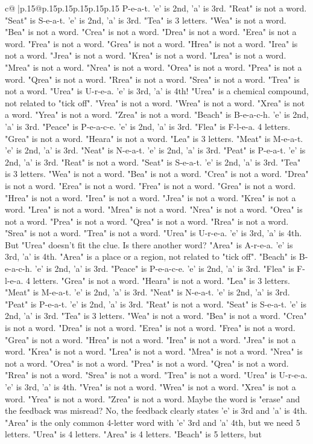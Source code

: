 \documentclass{article}
\begin{document}
{\begin{supertabular}{c@{$\;$}|p{.15\linewidth}@{}p{.15\linewidth}p{.15\linewidth}p{.15\linewidth}p{.15\linewidth}p{.15\linewidth}}
{{{P{-}e{-}a{-}t. 'e' is 2nd, 'a' is 3rd. "Reat" is not a word. "Seat" is S{-}e{-}a{-}t. 'e' is 2nd, 'a' is 3rd. "Tea" is 3 letters. "Wea" is not a word. "Bea" is not a word. "Crea" is not a word. "Drea" is not a word. "Erea" is not a word. "Frea" is not a word. "Grea" is not a word. "Hrea" is not a word. "Irea" is not a word. "Jrea" is not a word. "Krea" is not a word. "Lrea" is not a word. "Mrea" is not a word. "Nrea" is not a word. "Orea" is not a word. "Prea" is not a word. "Qrea" is not a word. "Rrea" is not a word. "Srea" is not a word. "Trea" is not a word. "Urea" is U{-}r{-}e{-}a. 'e' is 3rd, 'a' is 4th! "Urea" is a chemical compound, not related to "tick off". "Vrea" is not a word. "Wrea" is not a word. "Xrea" is not a word. "Yrea" is not a word. "Zrea" is not a word. "Beach" is B{-}e{-}a{-}c{-}h. 'e' is 2nd, 'a' is 3rd. "Peace" is P{-}e{-}a{-}c{-}e. 'e' is 2nd, 'a' is 3rd. "Flea" is F{-}l{-}e{-}a. 4 letters. "Grea" is not a word. "Heara" is not a word. "Lea" is 3 letters. "Meat" is M{-}e{-}a{-}t. 'e' is 2nd, 'a' is 3rd. "Neat" is N{-}e{-}a{-}t. 'e' is 2nd, 'a' is 3rd. "Peat" is P{-}e{-}a{-}t. 'e' is 2nd, 'a' is 3rd. "Reat" is not a word. "Seat" is S{-}e{-}a{-}t. 'e' is 2nd, 'a' is 3rd. "Tea" is 3 letters. "Wea" is not a word. "Bea" is not a word. "Crea" is not a word. "Drea" is not a word. "Erea" is not a word. "Frea" is not a word. "Grea" is not a word. "Hrea" is not a word. "Irea" is not a word. "Jrea" is not a word. "Krea" is not a word. "Lrea" is not a word. "Mrea" is not a word. "Nrea" is not a word. "Orea" is not a word. "Prea" is not a word. "Qrea" is not a word. "Rrea" is not a word. "Srea" is not a word. "Trea" is not a word. "Urea" is U{-}r{-}e{-}a. 'e' is 3rd, 'a' is 4th. But "Urea" doesn't fit the clue. Is there another word? "Area" is A{-}r{-}e{-}a. 'e' is 3rd, 'a' is 4th. "Area" is a place or a region, not related to "tick off". "Beach" is B{-}e{-}a{-}c{-}h. 'e' is 2nd, 'a' is 3rd. "Peace" is P{-}e{-}a{-}c{-}e. 'e' is 2nd, 'a' is 3rd. "Flea" is F{-}l{-}e{-}a. 4 letters. "Grea" is not a word. "Heara" is not a word. "Lea" is 3 letters. "Meat" is M{-}e{-}a{-}t. 'e' is 2nd, 'a' is 3rd. "Neat" is N{-}e{-}a{-}t. 'e' is 2nd, 'a' is 3rd. "Peat" is P{-}e{-}a{-}t. 'e' is 2nd, 'a' is 3rd. "Reat" is not a word. "Seat" is S{-}e{-}a{-}t. 'e' is 2nd, 'a' is 3rd. "Tea" is 3 letters. "Wea" is not a word. "Bea" is not a word. "Crea" is not a word. "Drea" is not a word. "Erea" is not a word. "Frea" is not a word. "Grea" is not a word. "Hrea" is not a word. "Irea" is not a word. "Jrea" is not a word. "Krea" is not a word. "Lrea" is not a word. "Mrea" is not a word. "Nrea" is not a word. "Orea" is not a word. "Prea" is not a word. "Qrea" is not a word. "Rrea" is not a word. "Srea" is not a word. "Trea" is not a word. "Urea" is U{-}r{-}e{-}a. 'e' is 3rd, 'a' is 4th. "Vrea" is not a word. "Wrea" is not a word. "Xrea" is not a word. "Yrea" is not a word. "Zrea" is not a word. Maybe the word is "erase" and the feedback was misread? No, the feedback clearly states 'e' is 3rd and 'a' is 4th. "Area" is the only common 4{-}letter word with 'e' 3rd and 'a' 4th, but we need 5 letters. "Urea" is 4 letters. "Area" is 4 letters. "Beach" is 5 letters, but }}}
\end{supertabular}}
\end{document}
